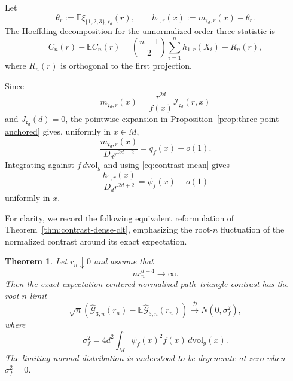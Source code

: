 \documentclass[11pt]{article}
\newtheorem{theorem}{Theorem}[section]
\theoremstyle{remark}
\newcommand{\E}{\mathbb E}
\numberwithin{equation}{section}
\begin{document}
Let
\[
\theta_r:=\E\xi_{\{1,2,3\},\mathfrak c_d}(r),
\qquad
h_{1,r}(x):=m_{\mathfrak c_d,r}(x)-\theta_r.
\]
The Hoeffding decomposition for the unnormalized order-three statistic is
\begin{equation}
C_n(r)-\E C_n(r)
=\binom{n-1}{2}\sum_{i=1}^nh_{1,r}(X_i)+R_n(r),
\label{eq:contrast-Hoeffding-decomposition}
\end{equation}
where $R_n(r)$ is orthogonal to the first projection.

Since
\[
m_{\mathfrak c_d,r}(x)
=\frac{r^{2d}}{f(x)}\mathcal I_{\mathfrak c_d}(r,x)
\]
and $J_{\mathfrak c_d}(d)=0$, the pointwise expansion in
Proposition~\ref{prop:three-point-anchored} gives, uniformly in $x\in M$,
\begin{equation}
\frac{m_{\mathfrak c_d,r}(x)}{D_dr^{2d+2}}
=q_f(x)+o(1).
\label{eq:conditional-contrast-expansion}
\end{equation}
Integrating against $f\,d\mathrm{vol}_g$ and using
\eqref{eq:contrast-mean} gives
\begin{equation}
\frac{h_{1,r}(x)}{D_dr^{2d+2}}
=\psi_f(x)+o(1)
\label{eq:first-projection-limit}
\end{equation}
uniformly in $x$.

For clarity, we record the following equivalent reformulation of
Theorem~\ref{thm:contrast-dense-clt}, emphasizing the root-$n$ fluctuation
of the normalized contrast around its exact expectation.

\begin{theorem}
\label{thm:contrast-dense-clt-revise}
Let $r_n\downarrow0$ and assume that
\[
n r_n^{d+4}\longrightarrow\infty.
\]
Then the exact-expectation-centered normalized path--triangle contrast has
the root-$n$ limit
\[
\sqrt n\left(
\widehat{\mathcal G}_{3,n}(r_n)
-\E\widehat{\mathcal G}_{3,n}(r_n)
\right)
\xrightarrow{\mathcal D}
N(0,\sigma_f^2),
\]
where
\[
\sigma_f^2
=
4d^2\int_M\psi_f(x)^2f(x)\,d\mathrm{vol}_g(x).
\]
The limiting normal distribution is understood to be degenerate at zero
when $\sigma_f^2=0$.
\end{theorem}
\end{document}
